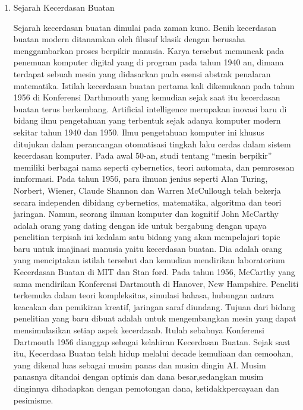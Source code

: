 \begin{enumerate}
\item Sejarah Kecerdasan Buatan
	\par Sejarah kecerdasan buatan dimulai pada zaman kuno. Benih kecerdasan buatan modern ditanamkan oleh filusuf klasik dengan berusaha menggambarkan proses berpikir manusia. Karya tersebut memuncak pada penemuan komputer digital yang di program pada tahun 1940 an, dimana terdapat sebuah mesin yang didasarkan pada esensi abstrak penalaran matematika. 
Istilah kecerdasan buatan pertama kali dikemukaan pada tahun 1956 di Konferensi Darthmouth yang kemudian sejak saat itu kecerdasan buatan terus berkembang. Artiﬁcial intelligence merupakan inovasi baru di bidang ilmu pengetahuan yang terbentuk sejak adanya komputer modern sekitar tahun 1940 dan 1950. Ilmu pengetahuan komputer ini khusus ditujukan dalam perancangan otomatisasi tingkah laku cerdas dalam sistem kecerdasan komputer. Pada awal 50-an, studi tentang “mesin berpikir” memiliki berbagai nama seperti cybernetics, teori automata, dan pemrosesan innformasi. Pada tahun 1956, para ilmuan jenius seperti Alan Turing, Norbert, Wiener, Claude Shannon dan Warren McCullough telah bekerja secara independen dibidang cybernetics, matematika, algoritma dan teori jaringan. Namun, seorang ilmuan komputer dan kognitif John McCarthy adalah orang yang dating dengan ide untuk bergabung dengan upaya penelitian terpisah ini kedalam satu bidang yang akan mempelajari topic baru untuk imajinasi manusia yaitu kecerdasan buatan. Dia adalah orang yang menciptakan istilah tersebut dan kemudian mendirikan laboratorium Kecerdasan Buatan di MIT dan Stan ford. Pada tahun 1956, McCarthy yang sama mendirikan Konferensi Dartmouth di Hanover, New Hampshire. Peneliti terkemuka dalam teori kompleksitas, simulasi bahasa, hubungan antara keacakan dan pemikiran kreatif, jaringan saraf diundang. Tujuan dari bidang penelitian yang baru dibuat adalah untuk mengembangkan mesin yang dapat mensimulasikan setiap aspek kecerdasab. Itulah sebabnya Konferensi Dartmouth 1956 dianggap sebagai kelahiran Kecerdasan Buatan. Sejak saat itu, Kecerdasa Buatan telah hidup melalui decade kemuliaan dan cemoohan, yang dikenal luas sebagai musim panas dan musim dingin AI. Musim panasnya ditandai dengan optimis dan dana besar,sedangkan musim dinginnya dihadapkan dengan pemotongan dana, ketidakkpercayaan dan pesimisme.


\end{enumerate}
